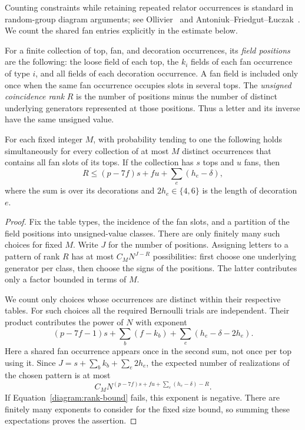Counting constraints while retaining repeated relator occurrences is
standard in random-group diagram arguments; see
Ollivier~\cite[Section~2]{Ollivier2004} and
Antoniuk--Friedgut--\L uczak~\cite[Section~3]{AntoniukFriedgutLuczak2017}.
We count the shared fan entries explicitly in the estimate below.

For a finite collection of top, fan, and decoration occurrences, its
\emph{field positions} are the following: the loose field of each top,
the $k_i$ fields of each fan occurrence of type $i$, and all fields of
each decoration occurrence.  A fan field is included only once when the
same fan occurrence occupies slots in several tops.  The
\emph{unsigned coincidence rank} $R$ is the number of positions minus
the number of distinct underlying generators represented at those
positions.  Thus a letter and its inverse have the same unsigned value.

\begin{lemma}\label{diagram:rank}
For each fixed integer $M$, with probability tending to one the
following holds simultaneously for every collection of at most $M$
distinct occurrences that contains all fan slots of its tops.  If the
collection has $s$ tops and $u$ fans, then
\begin{equation}\label{diagram:rank-bound}
 R\le (p-7f)s+fu+\sum_e(h_e-\delta),
\end{equation}
where the sum is over its decorations and $2h_e\in\{4,6\}$ is the
length of decoration $e$.
\end{lemma}

\begin{proof}
Fix the table types, the incidence of the fan slots, and a partition of
the field positions into unsigned-value classes.  There are only
finitely many such choices for fixed $M$.  Write $J$ for the number of
positions.  Assigning letters to a pattern of rank $R$ has at most
$C_M N^{J-R}$ possibilities: first choose one underlying generator per
class, then choose the signs of the positions.  The latter contributes
only a factor bounded in terms of $M$.

We count only choices whose occurrences are distinct within their
respective tables.  For such choices all the required Bernoulli trials
are independent.  Their product contributes the power of $N$ with
exponent
\[
 (p-7f-1)s+\sum_b(f-k_b)
       +\sum_e(h_e-\delta-2h_e).
\]
Here a shared fan occurrence appears once in the second sum, not once
per top using it.  Since
$J=s+\sum_b k_b+\sum_e2h_e$, the expected number of realizations of the
chosen pattern is at most
\[
 C_M N^{(p-7f)s+fu+\sum_e(h_e-\delta)-R}.
\]
If Equation~\eqref{diagram:rank-bound} fails, this exponent is negative.
There are finitely many exponents to consider for the fixed size bound,
so summing these expectations proves the assertion.
\end{proof}

